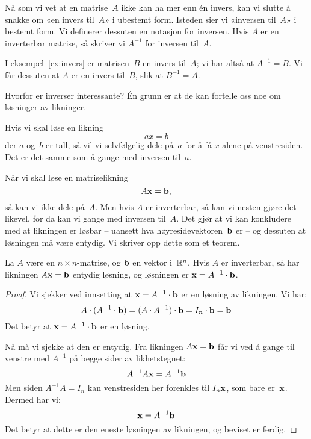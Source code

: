 Nå som vi vet at en matrise~$A$ ikke kan ha mer enn én invers, kan vi
slutte å snakke om «en invers til~$A$» i ubestemt form.  Isteden sier
vi «inversen til~$A$» i bestemt form.  Vi definerer dessuten en
notasjon for inversen.  Hvis $A$ er en inverterbar matrise, så skriver
vi $A^{-1}$ for inversen til~$A$.

\begin{ex}
I eksempel~\ref{ex:invers} er matrisen~$B$ en invers til~$A$; vi har
altså at $A^{-1} = B$.  Vi får dessuten at $A$ er en invers til~$B$,
slik at $B^{-1} = A$.
\end{ex}

Hvorfor er inverser interessante?  Én grunn er at de kan fortelle oss
noe om løsninger av likninger.

Hvis vi skal løse en likning
\[
ax = b
\]
der $a$ og~$b$ er tall, så vil vi selvfølgelig dele på~$a$ for å få
$x$ alene på venstresiden.  Det er det samme som å gange med inversen
til~$a$.

Når vi skal løse en matriselikning
\[
A \mathbf{x} = \mathbf{b},
\]
så kan vi ikke dele på~$A$.  Men hvis $A$ er inverterbar, så kan vi
nesten gjøre det likevel, for da kan vi gange med inversen til~$A$.
Det gjør at vi kan konkludere med at likningen er løsbar -- uansett
hva høyresidevektoren~$\mathbf{b}$ er -- og dessuten at løsningen må være
entydig.  Vi skriver opp dette som et teorem.

\begin{thm}
\label{thm:invers-Ax=b}
La $A$ være en $n \times n$-matrise, og $\mathbf{b}$ en vektor i~$\mathbb{R}^n$.
Hvis $A$ er inverterbar, så har likningen $A \mathbf{x} = \mathbf{b}$ entydig
løsning, og løsningen er $\mathbf{x} = A^{-1} \cdot \mathbf{b}$.
\end{thm}
\begin{proof}
Vi sjekker ved innsetting at $\mathbf{x} = A^{-1} \cdot \mathbf{b}$ er en
løsning av likningen.  Vi har:
\[
A \cdot (A^{-1} \cdot \mathbf{b})
 = (A \cdot A^{-1}) \cdot \mathbf{b}
 = I_n \cdot \mathbf{b}
 = \mathbf{b}
\]
Det betyr at $\mathbf{x} = A^{-1} \cdot \mathbf{b}$ er en løsning.

Nå må vi sjekke at den er entydig.  Fra likningen $A \mathbf{x} = \mathbf{b}$
får vi ved å gange til venstre med $A^{-1}$ på begge sider av
likhetstegnet:
\[
A^{-1} A \mathbf{x} = A^{-1} \mathbf{b}
\]
Men siden $A^{-1} A = I_n$ kan venstresiden her forenkles til
$I_n \mathbf{x}$, som bare er~$\mathbf{x}$.  Dermed har vi:
\[
\mathbf{x} = A^{-1} \mathbf{b}
\]
Det betyr at dette er den eneste løsningen av likningen, og beviset er
ferdig.
\end{proof}

